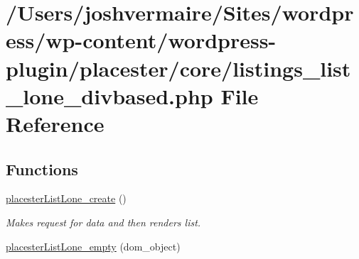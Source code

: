 \hypertarget{listings__list__lone__divbased_8php}{
\section{/Users/joshvermaire/Sites/wordpress/wp-\/content/wordpress-\/plugin/placester/core/listings\_\-list\_\-lone\_\-divbased.php File Reference}
\label{d4/dc6/listings__list__lone__divbased_8php}
}
\subsection*{Functions}
\begin{DoxyCompactItemize}
\item 
\hyperlink{listings__list__lone__divbased_8php_a6ecffcd6a4cc493ef7c109eb1dcc284d}{placesterListLone\_\-create} ()
\begin{DoxyCompactList}\small\item\em Makes request for data and then renders list. \end{DoxyCompactList}\item 
\hyperlink{listings__list__lone__divbased_8php_a7080108f39701f6ebcc95f080ac4bce9}{placesterListLone\_\-empty} (dom\_\-object)
\end{DoxyCompactItemize}
